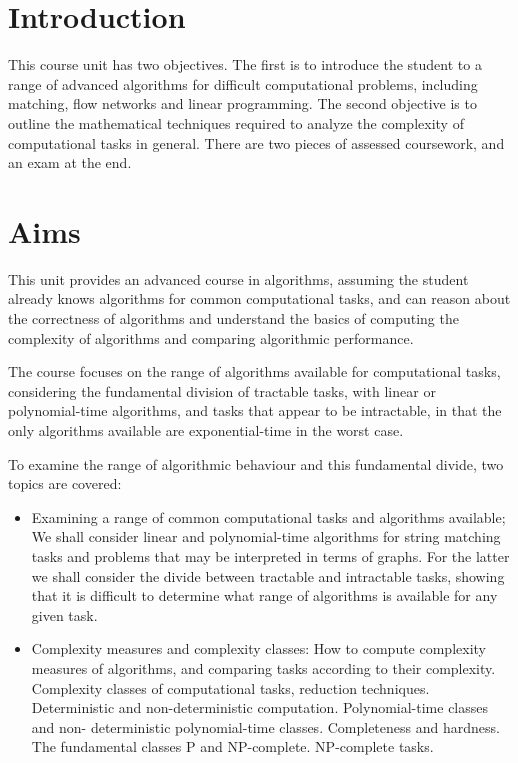 \section*{Introduction}

This course unit has two objectives. The first is to introduce the student to a
range of advanced algorithms for difficult computational problems, including
matching, flow networks and linear programming. The second objective is to
outline the mathematical techniques required to analyze the complexity of
computational tasks in general. There are two pieces of assessed coursework, and
an exam at the end.

\section*{Aims}
This unit provides an advanced course in algorithms, assuming the student
already knows algorithms for common computational tasks, and can reason about
the correctness of algorithms and understand the basics of computing the
complexity of algorithms and comparing algorithmic performance.

The course focuses on the range of algorithms available for computational tasks,
considering the fundamental division of tractable tasks, with linear or
polynomial-time algorithms, and tasks that appear to be intractable, in that the
only algorithms available are exponential-time in the worst case.

To examine the range of algorithmic behaviour and this fundamental divide, two
topics are covered:

\begin{itemize}

  \item Examining a range of common computational tasks and algorithms available;
  We shall consider linear and polynomial-time algorithms for string matching
  tasks and problems that may be interpreted in terms of graphs. For the latter
  we shall consider the divide between tractable and intractable tasks, showing
  that it is difficult to determine what range of algorithms is available for
  any given task.

  \item Complexity measures and complexity classes: How to compute complexity
  measures of algorithms, and comparing tasks according to their complexity.
  Complexity classes of computational tasks, reduction techniques. Deterministic
  and non-deterministic computation. Polynomial-time classes and non-
  deterministic polynomial-time classes. Completeness and hardness. The
  fundamental classes P and NP-complete. NP-complete tasks.

\end{itemize}


